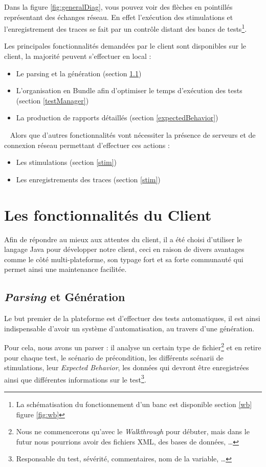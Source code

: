 Dans la figure \ref{fig:generalDiag}, vous pouvez voir des flèches en pointillés représentant des échanges réseau. En effet
l'exécution des stimulations et l'enregistrement des traces se fait par un contrôle distant des bancs de tests\footnote{La
	schématisation du fonctionnement d'un banc est disponible section \ref{wb} figure \ref{fig:wb}}.

Les principales fonctionnalités demandées par le client sont disponibles sur le client, la majorité peuvent s'effectuer en local : 
\begin{itemize}
	\item Le parsing et la génération (section \ref{generation})
	\item L'organisation en Bundle afin d'optimiser le temps d'exécution des tests (section \ref{testManager})
	\item La production de rapports détaillés (section \ref{expectedBehavior})
\end{itemize}~\newline
Alors que d'autres fonctionnalités vont nécessiter la présence de serveurs et de connexion réseau permettant d'effectuer ces actions
: 
\begin{itemize}
	\item Les stimulations (section \ref{stim})
	\item Les enregistrements des traces (section \ref{stim})
\end{itemize}
\vspace{-10px}
\section{Les fonctionnalités du Client}
Afin de répondre au mieux aux attentes du client, il a été choisi d'utiliser le langage Java pour développer notre client, ceci en raison de
divers avantages comme le côté multi-plateforme, son typage fort et sa forte communauté qui permet ainsi une maintenance facilitée. 

\subsection{\textit{Parsing} et Génération}\label{generation}
Le but premier de la plateforme est d'effectuer des tests automatiques, il est ainsi indispensable d'avoir un système d'automatisation, au travers d'une génération.

Pour cela, nous avons un parser : il analyse un certain type de fichier\footnote{Nous ne commencerons qu'avec le \textit{Walkthrough} pour débuter, mais dans le futur nous pourrions avoir des fichiers XML, des bases de données, \ldots} et en retire pour chaque test, le scénario de précondition, les différents scénarii de stimulations, leur \textit{Expected Behavior}, les données qui devront être enregistrées ainsi que différentes informations sur le test\footnote{Responsable du test, sévérité, commentaires, nom de la variable, \ldots}.

